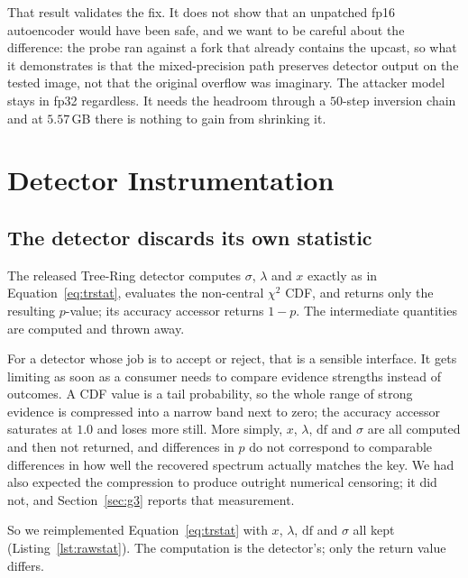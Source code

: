\documentclass[10pt,twocolumn]{article}
\newcommand{\xstat}{\ensuremath{x}}
\newcommand{\lam}{\ensuremath{\lambda}}
\begin{document}
That result validates the fix. It does not show that an unpatched fp16 autoencoder
would have been safe, and we want to be careful about the difference: the probe ran
against a fork that already contains the upcast, so what it demonstrates is that the
mixed-precision path preserves detector output on the tested image, not that the
original overflow was imaginary. The attacker model stays in fp32 regardless. It needs
the headroom through a $50$-step inversion chain and at $5.57$\,GB there is nothing to
gain from shrinking it.
\section{Detector Instrumentation}
\label{sec:instr}

\subsection{The detector discards its own statistic}

The released Tree-Ring detector computes $\sigma$, $\lam$ and $\xstat$ exactly as in
Equation~\ref{eq:trstat}, evaluates the non-central $\chi^2$ CDF, and returns only the
resulting $p$-value; its accuracy accessor returns $1 - p$. The intermediate
quantities are computed and thrown away.

For a detector whose job is to accept or reject, that is a sensible interface. It gets
limiting as soon as a consumer needs to compare evidence strengths instead of
outcomes. A CDF value is a tail probability, so the whole range of strong evidence is
compressed into a narrow band next to zero; the accuracy accessor saturates at $1.0$
and loses more still. More simply, $\xstat$, $\lam$, $\mathrm{df}$ and $\sigma$ are all
computed and then not returned, and differences in $p$ do not correspond to comparable
differences in how well the recovered spectrum actually matches the key. We had also
expected the compression to produce outright numerical censoring; it did not, and
Section~\ref{sec:g3} reports that measurement.

So we reimplemented Equation~\ref{eq:trstat} with $\xstat$, $\lam$, $\mathrm{df}$ and
$\sigma$ all kept (Listing~\ref{lst:rawstat}). The computation is the detector's; only
the return value differs.
\end{document}
